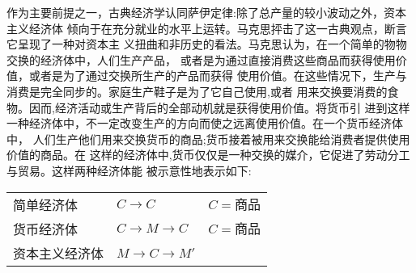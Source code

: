 作为主要前提之一，古典经济学认同萨伊定律:除了总产量的较小波动之外，资本主义经济体
倾向于在充分就业的水平上运转。马克思抨击了这一古典观点，断言它呈现了一种对资本主
义扭曲和非历史的看法。马克思认为，在一个简单的物物交换的经济体中，人们生产产品，
或者是为通过直接消费这些商品而获得使用价值，或者是为了通过交换所生产的产品而获得
使用价值。在这些情况下，生产与消费是完全同步的。家庭生产鞋子是为了它自己使用,或者
用来交换要消费的食物。因而,经济活动或生产背后的全部动机就是获得使用价值。将货币引
进到这样一种经济体中，不一定改变生产的方向而使之远离使用价值。在一个货币经济体中，
人们生产他们用来交换货币的商品;货币接着被用来交换能给消费者提供使用价值的商品。在
这样的经济体中,货币仅仅是一种交换的媒介，它促进了劳动分工与贸易。这样两种经济体能
被示意性地表示如下:
\begin{table}[htbp]
  \centering
    \begin{tabular}{@{}llr@{}}
     简单经济体 &  $C \rightarrow C$ & $C=商品$ \\
     货币经济体 &  $C \rightarrow M \rightarrow C$ & $C=商品$ \\
     资本主义经济体 &  $ M \rightarrow C \rightarrow M'$ &
    \end{tabular}%
\end{table}


